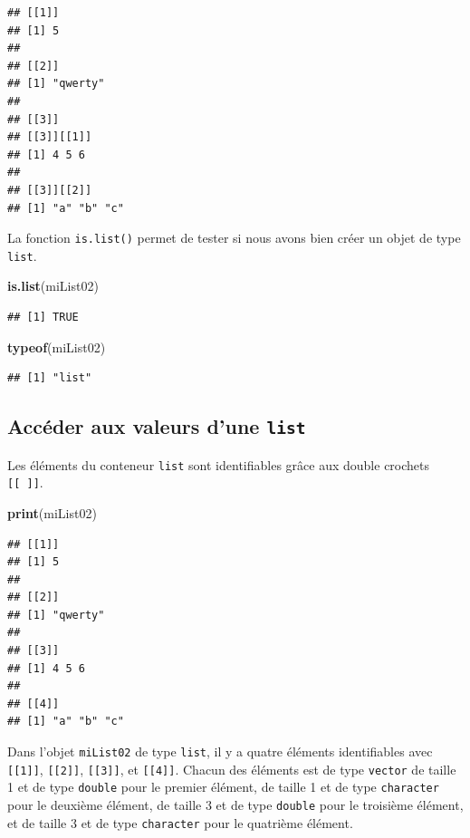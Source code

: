 \documentclass[twoside,symmetric]{book}
\newenvironment{Shaded}{}{}
\newcommand{\KeywordTok}[1]{\textbf{#1}}
\newcommand{\NormalTok}[1]{#1}
\begin{document}
\begin{verbatim}
## [[1]]
## [1] 5
## 
## [[2]]
## [1] "qwerty"
## 
## [[3]]
## [[3]][[1]]
## [1] 4 5 6
## 
## [[3]][[2]]
## [1] "a" "b" "c"
\end{verbatim}

La fonction \texttt{is.list()} permet de tester si nous avons bien créer un objet de type \texttt{list}.

\begin{Shaded}
\begin{Highlighting}[]
\KeywordTok{is.list}\NormalTok{(miList02)}
\end{Highlighting}
\end{Shaded}

\begin{verbatim}
## [1] TRUE
\end{verbatim}

\begin{Shaded}
\begin{Highlighting}[]
\KeywordTok{typeof}\NormalTok{(miList02)}
\end{Highlighting}
\end{Shaded}

\begin{verbatim}
## [1] "list"
\end{verbatim}

\hypertarget{accuxe9der-aux-valeurs-dune-list}{%
\subsection{\texorpdfstring{Accéder aux valeurs d'une \texttt{list}}{Accéder aux valeurs d'une list}}\label{accuxe9der-aux-valeurs-dune-list}}

Les éléments du conteneur \texttt{list} sont identifiables grâce aux double crochets \texttt{{[}{[}\ {]}{]}}.

\begin{Shaded}
\begin{Highlighting}[]
\KeywordTok{print}\NormalTok{(miList02)}
\end{Highlighting}
\end{Shaded}

\begin{verbatim}
## [[1]]
## [1] 5
## 
## [[2]]
## [1] "qwerty"
## 
## [[3]]
## [1] 4 5 6
## 
## [[4]]
## [1] "a" "b" "c"
\end{verbatim}

Dans l'objet \texttt{miList02} de type \texttt{list}, il y a quatre éléments identifiables avec \texttt{{[}{[}1{]}{]}}, \texttt{{[}{[}2{]}{]}}, \texttt{{[}{[}3{]}{]}}, et \texttt{{[}{[}4{]}{]}}. Chacun des éléments est de type \texttt{vector} de taille 1 et de type \texttt{double} pour le premier élément, de taille 1 et de type \texttt{character} pour le deuxième élément, de taille 3 et de type \texttt{double} pour le troisième élément, et de taille 3 et de type \texttt{character} pour le quatrième élément.
\end{document}
